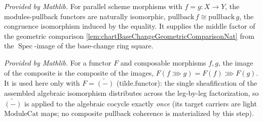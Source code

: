 \begin{lemma}
  \label{lem:pullbackCongr_mathlib}
  \mathlibok
  \textit{Provided by Mathlib.}
  For parallel scheme morphisms with \(f = g : X \to Y\), the modules-pullback functors are naturally
  isomorphic, \(\mathrm{pullback}\,f \cong \mathrm{pullback}\,g\), the congruence isomorphism induced
  by the equality. It supplies the middle factor of the geometric comparison
  \cref{lem:chartBaseChangeGeometricComparisonNat} from the \(\operatorname{Spec}\)-image of the
  base-change ring square.
\end{lemma}

\begin{lemma}
  \label{lem:functor_map_comp_mathlib}
  \mathlibok
  \textit{Provided by Mathlib.}
  For a functor \(F\) and composable morphisms \(f, g\), the image of the composite is the composite of
  the images, \(F(f \ggg g) = F(f) \ggg F(g)\). It is used here only with \(F = \widetilde{(-)}\)
  (\(\mathrm{tilde.functor}\)): the single sheafification of the assembled algebraic isomorphism
  distributes across the leg-by-leg factorization, so \(\widetilde{(-)}\) is applied to the algebraic
  cocycle exactly \emph{once} (its target carriers are light \(\mathrm{ModuleCat}\) maps; no composite
  pullback coherence is materialized by this step).
\end{lemma}

